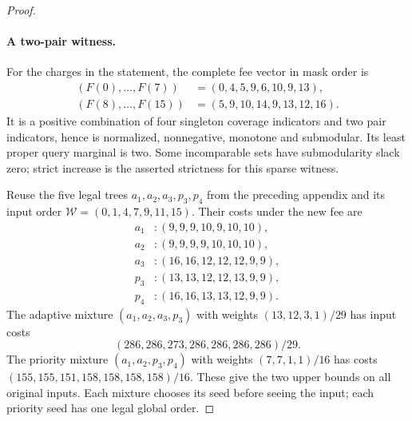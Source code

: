 \begin{proof}
\paragraph*{A two-pair witness.}
For the charges in the statement, the complete fee vector in mask order is
\begin{align*}
 (F(0),\ldots,F(7))&=(0,4,5,9,6,10,9,13),\\
 (F(8),\ldots,F(15))&=(5,9,10,14,9,13,12,16).
\end{align*}
It is a positive combination of four singleton coverage indicators and
two pair indicators, hence is normalized, nonnegative, monotone and
submodular. Its least proper query marginal is two. Some incomparable
sets have submodularity slack zero; strict increase is the asserted
strictness for this sparse witness.

Reuse the five legal trees $a_1,a_2,a_3,p_3,p_4$ from the preceding
appendix and its input order $\mathcal W=(0,1,4,7,9,11,15)$. Their costs
under the new fee are
\begin{align*}
 a_1&:(9,9,9,10,9,10,10),\\
 a_2&:(9,9,9,9,10,10,10),\\
 a_3&:(16,16,12,12,12,9,9),\\
 p_3&:(13,13,12,12,13,9,9),\\
 p_4&:(16,16,13,13,12,9,9).
\end{align*}
The adaptive mixture $(a_1,a_2,a_3,p_3)$ with weights
$(13,12,3,1)/29$ has input costs
\[
 (286,286,273,286,286,286,286)/29.
\]
The priority mixture $(a_1,a_2,p_3,p_4)$ with weights $(7,7,1,1)/16$
has costs $(155,155,151,158,158,158,158)/16$. These give the two upper
bounds on all original inputs. Each mixture chooses its seed before
seeing the input; each priority seed has one legal global order.


\end{proof}
